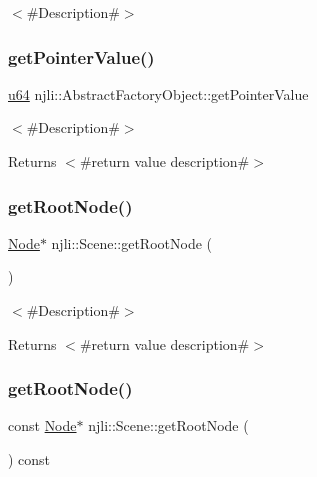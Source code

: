 $<$\#\+Description\#$>$ \mbox{\label{classnjli_1_1_scene_a4ffddf141a426a5a07d0ac19f1913811}} 
\subsubsection{\texorpdfstring{get\+Pointer\+Value()}{getPointerValue()}}
{\footnotesize\ttfamily \mbox{\hyperlink{_util_8h_ad758b7a5c3f18ed79d2fcd23d9f16357}{u64}} njli\+::\+Abstract\+Factory\+Object\+::get\+Pointer\+Value}

$<$\#\+Description\#$>$

\begin{DoxyReturn}{Returns}
$<$\#return value description\#$>$ 
\end{DoxyReturn}
\mbox{\label{classnjli_1_1_scene_a6bb6c79820215734862915f282c08058}} 
\subsubsection{\texorpdfstring{get\+Root\+Node()}{getRootNode()}\hspace{0.1cm}{\footnotesize\ttfamily [1/2]}}
{\footnotesize\ttfamily \mbox{\hyperlink{classnjli_1_1_node}{Node}}$\ast$ njli\+::\+Scene\+::get\+Root\+Node (\begin{DoxyParamCaption}{ }\end{DoxyParamCaption})}

$<$\#\+Description\#$>$

\begin{DoxyReturn}{Returns}
$<$\#return value description\#$>$ 
\end{DoxyReturn}
\mbox{\label{classnjli_1_1_scene_a9b9405d1a8582835baabce12fdcd8c1c}} 
\subsubsection{\texorpdfstring{get\+Root\+Node()}{getRootNode()}\hspace{0.1cm}{\footnotesize\ttfamily [2/2]}}
{\footnotesize\ttfamily const \mbox{\hyperlink{classnjli_1_1_node}{Node}}$\ast$ njli\+::\+Scene\+::get\+Root\+Node (\begin{DoxyParamCaption}{ }\end{DoxyParamCaption}) const}

